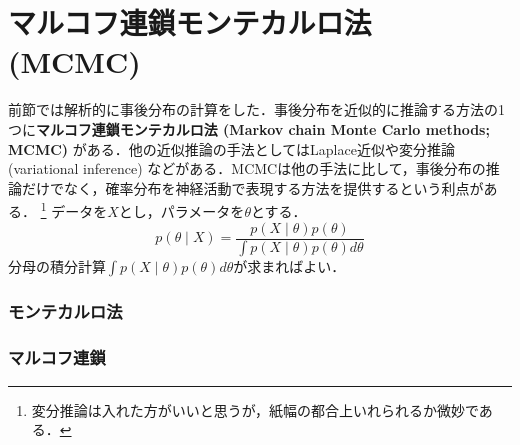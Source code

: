 \section{マルコフ連鎖モンテカルロ法 (MCMC)}
前節では解析的に事後分布の計算をした．事後分布を近似的に推論する方法の1つに\textbf{マルコフ連鎖モンテカルロ法 (Markov chain Monte Carlo methods; MCMC)} がある．他の近似推論の手法としてはLaplace近似や変分推論 (variational inference) などがある．MCMCは他の手法に比して，事後分布の推論だけでなく，確率分布を神経活動で表現する方法を提供するという利点がある．
\footnote{
変分推論は入れた方がいいと思うが，紙幅の都合上いれられるか微妙である．
}
データを$X$とし，パラメータを$\theta$とする．
\begin{equation}
p(\theta\mid X)=\frac{p(X\mid \theta)p(\theta)}{\int p(X\mid \theta)p(\theta)d\theta}
\end{equation}
分母の積分計算$\int p(X\mid \theta)p(\theta)d\theta$が求まればよい．
\subsubsection{モンテカルロ法}
\subsubsection{マルコフ連鎖}
